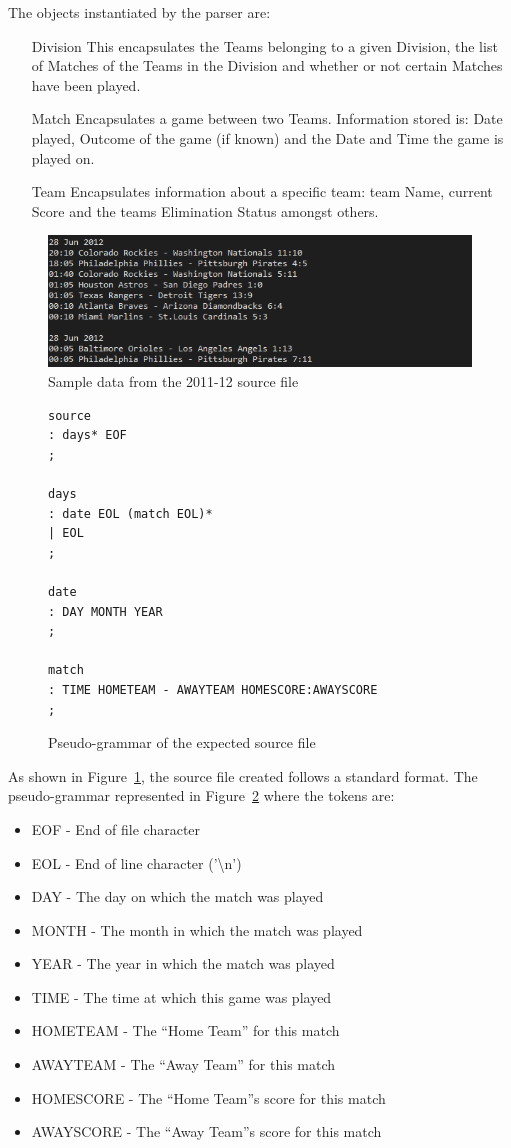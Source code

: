 The objects instantiated by the parser are:
\begin{itemize}
  \item[Division] This encapsulates the Teams belonging to a given
    Division, the list of Matches of the Teams in the Division and
    whether or not certain Matches have been played.
  \item[Match] Encapsulates a game between two Teams. Information
    stored is: Date played, Outcome of the game (if known) and the
    Date and Time the game is played on.
  \item[Team] Encapsulates information about a specific team: team
    Name, current Score and the teams Elimination Status amongst
    others.
\end{itemize}
\pagebreak
\begin{figure}[h]
  \includegraphics[width=\linewidth,keepaspectratio]{images/sourceFileExample.png}
  \caption{Sample data from the 2011-12 source file}\label{fig:BASESRC}
\end{figure}
\begin{figure}[h]
\begin{verbatim}
source
: days* EOF
;

days
: date EOL (match EOL)*
| EOL
;

date
: DAY MONTH YEAR
;

match
: TIME HOMETEAM - AWAYTEAM HOMESCORE:AWAYSCORE
;
\end{verbatim}

\caption{Pseudo-grammar of the expected source file}\label{fig:GRAMMAR}
\end{figure}
As shown in Figure~\ref{fig:BASESRC}, the source file created follows
a standard format. The pseudo-grammar represented in
Figure~\ref{fig:GRAMMAR} where the tokens are:
\begin{itemize}
\item EOF -  End of file character
\item EOL - End of line character ('\textbackslash n')
\item DAY - The day on which the match was played
\item MONTH - The month in which the match was played
\item YEAR - The year in which the match was played
\item TIME - The time at which this game was played
\item HOMETEAM - The ``Home Team'' for this match
\item AWAYTEAM - The ``Away Team'' for this match
\item HOMESCORE - The ``Home Team''s score for this match
\item AWAYSCORE - The ``Away Team''s score for this match
\end{itemize}

